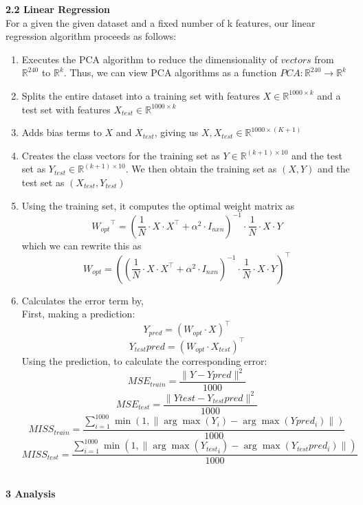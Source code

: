 \documentclass[a4paper]{article}
\begin{document}
\textbf{{\large 2.2 Linear Regression}} \\

For a given the given dataset and a fixed number of k features, our linear regression algorithm proceeds as follows: 
\begin{enumerate}
\item  Executes the PCA algorithm to reduce the dimensionality of $vectors$ from $\mathbb{R}^{240}$ to $\mathbb{R}^{k}$. Thus, we can view PCA algorithms as a function $PCA: \mathbb{R}^{240} \to \mathbb{R}^{k}$
\item Splits the entire dataset into a training set with features $X \in \mathbb{R}^{1000 \times k}$ and a test set with features $X_{test} \in \mathbb{R}^{1000 \times k}$
\item  Adds bias terms to $X$ and $X_{test}$, giving us $X, X_{test} \in \mathbb{R}^{1000 \times (K + 1)}$ 
\item Creates the class vectors for the training set as $Y \in \mathbb{R}^{(k + 1) \times 10}$ and the test set as $Y_{test} \in \mathbb{R}^{(k + 1) \times 10}$. We then obtain the training set as $(X, Y)$ and the test set as $(X_{test}, Y_{test})$
\item Using the training set, it computes the optimal weight matrix as 
$$ {W_{opt}}^\top = (\frac{1}{N} \cdot X \cdot X^\top + \alpha^2 \cdot I_{nxn})^{-1} \cdot \frac{1}{N} \cdot X \cdot Y $$
which we can rewrite this as 
$$ W_{opt} = ((\frac{1}{N} \cdot X \cdot X^\top + \alpha^2 \cdot I_{nxn})^{-1} \cdot \frac{1}{N} \cdot X \cdot Y)^\top $$
\item Calculates the error term by,  \\
First, making a prediction: 
$$ Y_{pred} = (W_{opt} \cdot X)^\top $$
$$ Y_{test}pred = (W_{opt} \cdot X_{test})^\top $$
Using the prediction, to calculate the corresponding error:
$$ MSE_{train} = \frac{\|Y - Ypred\|^2}{1000} $$
$$ MSE_{test} = \frac{\|Ytest - Y_{test}pred\|^2}{1000} $$
$$ MISS_{train} = \frac{\sum_{i = 1}^{1000} \min(1, \|\arg\max(Y_i) - \arg\max(Ypred_i)\|)}{1000} $$
$$ MISS_{test} = \frac{\sum_{i = 1}^{1000} \min(1, \|\arg\max({Y_{test}}_i) - \arg\max(Y_{test}pred_i)\|)}{1000} $$ \\ 
\end{enumerate}
\newpage
\textbf{{\Large 3 Analysis}} \\ 
\end{document}
